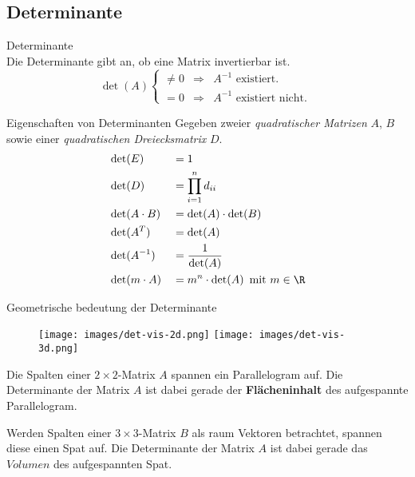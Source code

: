 \subsection{Determinante}
    \begin{definition}{Determinante}\\
        Die Determinante gibt an, ob eine Matrix invertierbar ist.
        \begin{equation*}
            \det(A)
            \left\{
                \begin{array}{lll}
                    \neq 0   &\Rightarrow    & A^{-1} \text{ existiert. }\\
                    = 0     &\Rightarrow    & A^{-1} \text{ existiert nicht. }
                \end{array}
            \right.
        \end{equation*}
    \end{definition}

    \begin{theorem}{Eigenschaften von Determinanten}
        Gegeben zweier \textit{quadratischer Matrizen} $A$, $B$ 
        sowie einer \textit{quadratischen Dreiecksmatrix} $D$.
        \begin{align*}
            &\det(E)        &&=1                     \\
            &\det(D)        &&=\prod_{i=1}^n d_{ii}  \\
            &\det(A\cdot B) &&=\det(A)\cdot\det(B)   \\
            &\det(A^T)      &&=\det(A)               \\
            &\det(A^{-1})   &&=\frac{1}{\det(A)}     \\
            &\det(m\cdot A) &&=m^n\cdot\det(A)\, \text{ mit } m\in \R
        \end{align*}
    \end{theorem}

    \begin{theorem}{Geometrische bedeutung der Determinante}


        \begin{wrapfigure}[16]{hr!}{0.35\linewidth}
            \vspace{-10pt}
            \texttt{[image: images/det-vis-2d.png]}
            \texttt{[image: images/det-vis-3d.png]}
        \end{wrapfigure}
        Die Spalten einer $2\times 2$-Matrix $A$ spannen ein Parallelogram auf.
        Die Determinante der Matrix $A$ ist dabei gerade der \textbf{Flächeninhalt} des aufgespannte Parallelogram.
        \vspace{1.25em}

        Werden Spalten einer $3\times 3$-Matrix $B$ als raum Vektoren betrachtet, 
        spannen diese einen Spat auf.
        Die Determinante der Matrix $A$ ist dabei gerade das $Volumen$ des aufgespannten Spat.
        \vspace{1em}
    \end{theorem}

